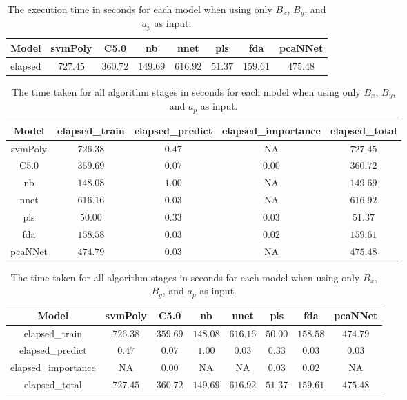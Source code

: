 \begin{table}[!ht]
	\centering
	\begin{tabular}{|c|c|c|c|c|c|c|c|}
		\hline
		Model & svmPoly & C5.0 & nb & nnet & pls & fda & pcaNNet \\ \hline
		elapsed & $727.45$ & $360.72$ & $149.69$ & $616.92$ & $51.37$ & $159.61$ & $475.48$ \\ \hline
	\end{tabular}
	\caption{The execution time in seconds for each model when using only $B_{x}$, $B_{y}$, and $a_{p}$ as input.}
	\label{tab:time:reverse:xyap:total}
\end{table}

\begin{table}[!ht]
	\centering
	\begin{tabular}{|c|c|c|c|c|}
		\hline
		Model & elapsed_train & elapsed_predict & elapsed_importance & elapsed_total \\ \hline
		svmPoly & $726.38$ & $0.47$ & NA & $727.45$ \\ \hline
		C5.0 & $359.69$ & $0.07$ & $0.00$ & $360.72$ \\ \hline
		nb & $148.08$ & $1.00$ & NA & $149.69$ \\ \hline
		nnet & $616.16$ & $0.03$ & NA & $616.92$ \\ \hline
		pls & $50.00$ & $0.33$ & $0.03$ & $51.37$ \\ \hline
		fda & $158.58$ & $0.03$ & $0.02$ & $159.61$ \\ \hline
		pcaNNet & $474.79$ & $0.03$ & NA & $475.48$ \\ \hline
	\end{tabular}
	\caption{The time taken for all algorithm stages in seconds for each model when using only $B_{x}$, $B_{y}$, and $a_{p}$ as input.}
	\label{tab:time:xyap}
\end{table}

\begin{table}[!ht]
	\centering
	\begin{tabular}{|c|c|c|c|c|c|c|c|}
		\hline
		Model & svmPoly & C5.0 & nb & nnet & pls & fda & pcaNNet \\ \hline
		elapsed_train & $726.38$ & $359.69$ & $148.08$ & $616.16$ & $50.00$ & $158.58$ & $474.79$ \\ \hline
		elapsed_predict & $0.47$ & $0.07$ & $1.00$ & $0.03$ & $0.33$ & $0.03$ & $0.03$ \\ \hline
		elapsed_importance & NA & $0.00$ & NA & NA & $0.03$ & $0.02$ & NA \\ \hline
		elapsed_total & $727.45$ & $360.72$ & $149.69$ & $616.92$ & $51.37$ & $159.61$ & $475.48$ \\ \hline
	\end{tabular}
	\caption{The time taken for all algorithm stages in seconds for each model when using only $B_{x}$, $B_{y}$, and $a_{p}$ as input.}
	\label{tab:time:reverse:xyap}
\end{table}

